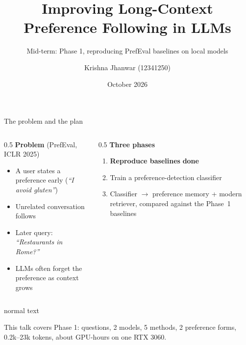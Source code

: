 \documentclass[aspectratio=169,11pt]{beamer}
\title{Improving Long-Context Preference Following in LLMs}
\subtitle{Mid-term: Phase 1, reproducing PrefEval baselines on local models}
\author{Krishna Jhanwar (12341250)}
\date{October 2026}
\newcommand{\takeaway}[1]{\vspace{4pt}\begin{beamercolorbox}[sep=6pt,rounded=true]{normal text}\colorbox{boxblue}{\parbox{0.93\linewidth}{\small #1}}\end{beamercolorbox}}
\begin{document}
\begin{frame}[plain]
\titlepage
\end{frame}

\begin{frame}{The problem and the plan}
\begin{columns}[T]
\begin{column}{0.5\textwidth}
\textbf{Problem} (PrefEval, ICLR 2025)
\begin{itemize}
  \item A user states a preference early (\emph{``I avoid gluten''})
  \item Unrelated conversation follows
  \item Later query: \emph{``Restaurants in Rome?''}
  \item LLMs often forget the preference as context grows
\end{itemize}
\end{column}
\begin{column}{0.5\textwidth}
\textbf{Three phases}
\begin{enumerate}
  \item \textbf{Reproduce baselines} \hfill \textcolor{accent}{\textbf{done}}
  \item Train a preference-detection classifier
  \item Classifier $\rightarrow$ preference memory + modern retriever, compared against the Phase~1 baselines
\end{enumerate}
\end{column}
\end{columns}
\takeaway{This talk covers Phase 1: \nQuestions{} questions, 2 models, 5 methods, 2 preference forms, 0.2k--23k tokens, about \gpuHours{} GPU-hours on one RTX 3060.}
\end{frame}
\end{document}
